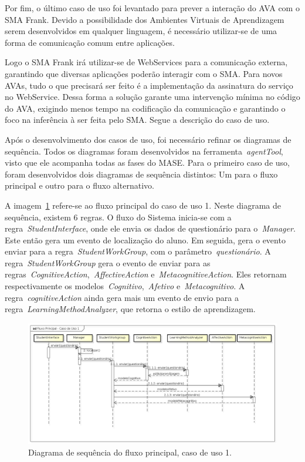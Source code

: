 Por fim, o último caso de uso foi levantado para prever a interação do AVA com o SMA Frank. Devido a possibilidade dos Ambientes Virtuais de Aprendizagem serem desenvolvidos em qualquer linguagem, é necessário utilizar-se de uma forma de comunicação comum entre aplicações.

Logo o SMA Frank irá utilizar-se de WebServices para a comunicação externa, garantindo que diversas aplicações poderão interagir com o SMA. Para novos AVAs, tudo o que precisará ser feito é a implementação da assinatura do serviço no WebService. Dessa forma a solução garante uma intervenção mínima no código do AVA, exigindo menos tempo na codificação da comunicação e garantindo o foco na inferência à ser feita pelo SMA. Segue a descrição do caso de uso.



Após o desenvolvimento dos casos de uso, foi necessário refinar os diagramas de sequência. Todos os diagramas foram desenvolvidos na ferramenta~\emph{agentTool}, visto que ele acompanha todas as fases do MASE. Para o primeiro caso de uso, foram desenvolvidos dois diagramas de sequência distintos: Um para o fluxo principal e outro para o fluxo alternativo.

A imagem~\ref{fig:dss-uc1-fluxo-principal} refere-se ao fluxo principal do caso de uso 1. Neste diagrama de sequência, existem 6 regras. O fluxo do Sistema inicia-se com a regra~\emph{StudentInterface}, onde ele envia os dados de questionário para o~\emph{Manager}. Este então gera um evento de localização do aluno. Em seguida, gera o evento enviar para a regra~\emph{StudentWorkGroup}, com o parâmetro~\emph{questionário}. A regra~\emph{StudentWorkGroup} gera o evento de enviar para as regras~\emph{CognitiveAction},~\emph{AffectiveAction} e~\emph{MetacognitiveAction}. Eles retornam respectivamente os modelos~\emph{Cognitivo},~\emph{Afetivo} e~\emph{Metacognitivo}. A regra~\emph{cognitiveAction} ainda gera mais um evento de envio para a regra~\emph{LearningMethodAnalyzer}, que retorna o estilo de aprendizagem.

\begin{figure}
	\centering
	\includegraphics[scale=0.48]{images/dss-uc1-fluxo-principal.png}
	\caption{Diagrama de sequência do fluxo principal, caso de uso 1.}
	\label{fig:dss-uc1-fluxo-principal}
\end{figure}

